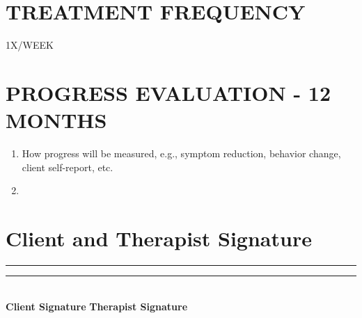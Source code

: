 \documentclass{article}
\begin{document}
\section*{\textsf{\textbf{TREATMENT FREQUENCY}}}
\parbox{0.3\textwidth}{1X/WEEK} 

\section*{\textsf{\textbf{PROGRESS EVALUATION - 12 MONTHS}}}
\begin{enumerate}[itemsep=0em, parsep=0em]
    \item How progress will be measured, e.g., symptom reduction, behavior change, client self-report, etc.
    \item
\end{enumerate}





\section*{\textbf{Client and Therapist Signature}}
\vspace{1cm}
\noindent\rule{7cm}{0.4pt} \hspace{2cm} \rule{7cm}{0.4pt} \\
\textbf{Client Signature} \hspace{4.5cm} \textbf{Therapist Signature}
\end{document}
